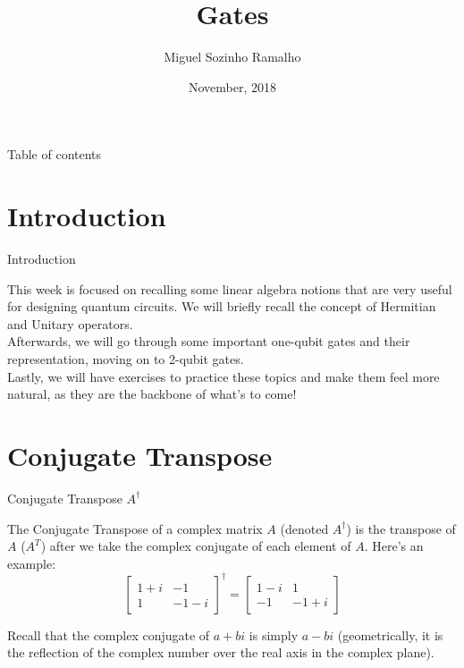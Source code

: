 \documentclass[aspectratio=43]{beamer}
\title{\q Gates}
\date{November, 2018}
\author[Ramalho]{Miguel Sozinho Ramalho}
\begin{document}
\begin{frame}
	\titlepage
\end{frame}


\begin{frame}{Table of contents}
	\begin{card}
		\tableofcontents
	\end{card}
\end{frame}


\section{Introduction}
\begin{frame}{Introduction}
    \begin{card}
    This week is focused on recalling some linear algebra notions that are very useful for designing quantum circuits. We will briefly recall the concept of Hermitian and Unitary operators.\\ Afterwards, we will go through some important one-qubit gates and their \qk representation, moving on to 2-qubit gates.\\Lastly, we will have exercises to practice these topics and make them feel more natural, as they are the backbone of what's to come!
    \end{card}
\pagenumber
\end{frame}

\section{Conjugate Transpose}
\begin{frame}{Conjugate Transpose $A^\dag$}
\begin{card}
    The Conjugate Transpose of a complex matrix $A$ (denoted $A^\dag$) is the transpose of $A$ ($A^T$) after we take the complex conjugate of each element of $A$. 
    Here's an example:
    \begin{equation*}
        \begin{bmatrix}1 + i & -1\\ 1 & -1 - i\end{bmatrix}^\dag
        =
        \begin{bmatrix}1 - i & 1\\ -1 & -1 + i\end{bmatrix}
    \end{equation*}
\end{card}
\begin{cardTiny}
    Recall that the complex conjugate of $a+bi$ is simply $a-bi$ (geometrically, it is the reflection of the complex number over the real axis in the complex plane).
\end{cardTiny}
\pagenumber
\end{frame}
\end{document}
